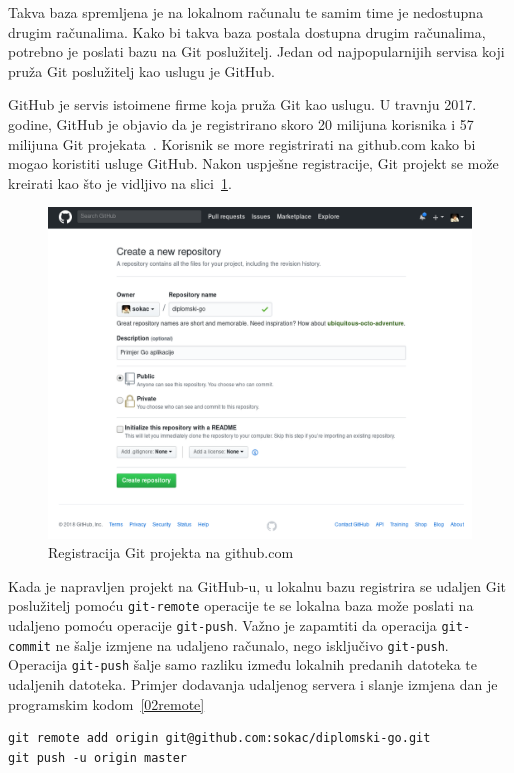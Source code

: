 Takva baza spremljena je na lokalnom računalu te samim time je nedostupna drugim računalima. Kako bi
takva baza postala dostupna drugim računalima, potrebno je poslati bazu na Git poslužitelj. Jedan
od najpopularnijih servisa koji pruža Git poslužitelj kao uslugu je GitHub.

GitHub je servis istoimene firme koja pruža Git kao uslugu. U travnju 2017. godine, GitHub je
objavio da je registrirano skoro 20 milijuna korisnika i 57 milijuna Git
projekata~\citep{github2017}. Korisnik se more registrirati na github.com kako bi mogao koristiti
usluge GitHub. Nakon uspješne registracije, Git projekt se može kreirati kao što je vidljivo na
slici~\ref{fig:02hgreg}.

\begin{figure}[h]
    \centering
    \includegraphics[width=\linewidth]{img/02/gh.png}
    \caption{Registracija Git projekta na github.com}%
    \label{fig:02hgreg}
\end{figure}

Kada je napravljen projekt na GitHub-u, u lokalnu bazu registrira se udaljen Git poslužitelj pomoću
\texttt{git-remote} operacije te se lokalna baza može poslati na udaljeno pomoću operacije
\texttt{git-push}. Važno je zapamtiti da operacija \texttt{git-commit} ne šalje izmjene na udaljeno
računalo, nego isključivo \texttt{git-push}.  Operacija \texttt{git-push} šalje samo razliku između
lokalnih predanih datoteka te udaljenih datoteka.  Primjer dodavanja udaljenog servera i slanje
izmjena dan je programskim kodom~\ref{02remote}

\begin{lstlisting}[float=h]
git remote add origin git@github.com:sokac/diplomski-go.git
git push -u origin master
\end{lstlisting}

